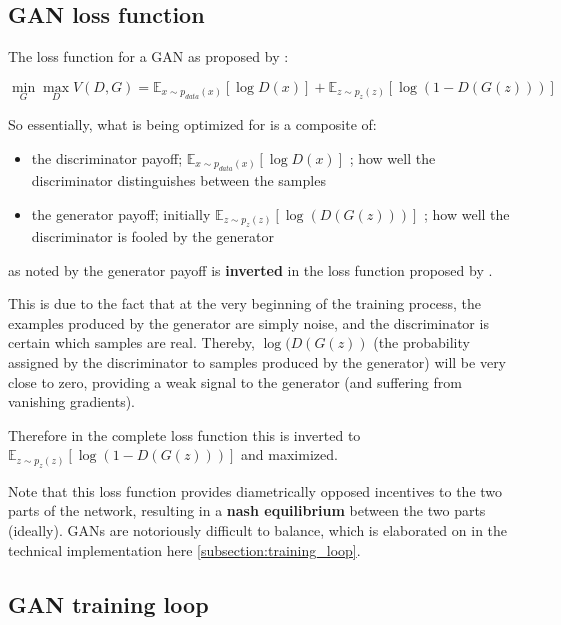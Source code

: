 \pagebreak

\subsection{GAN loss function}

The loss function for a \ac{GAN} as proposed by \cite{goodfellow2014generative}:

$$\min_G \max_D V(D, G)=
\mathbb{E}_{x\sim p_{data}(x)}[\log D(x)]
+ \mathbb{E}_{z\sim p_z(z)}[\log(1 - D(G(z)))]$$

So essentially, what is being optimized for is a composite of:

\begin{itemize}
	\item the discriminator payoff; $\mathbb{E}_{x\sim p_{data}(x)}[\log D(x)]$ ; how well the discriminator distinguishes between the samples
	\item the generator payoff; initially $\mathbb{E}_{z\sim p_z(z)}[\log(D(G(z)))]$ ; how well the discriminator is fooled by the generator
\end{itemize}

as noted by \cite{raschka2017python} the generator payoff is \textbf{inverted} in the loss function proposed by \cite{goodfellow2014generative}. 

This is due to the fact that at the very beginning of the training process, the examples produced by the generator are simply noise, and the discriminator is certain which samples are real. Thereby, $\log(D(G(z))$ (the probability assigned by the discriminator to samples produced by the generator) will be very close to zero, providing a weak signal to the generator (and suffering from vanishing gradients). 

Therefore in the complete loss function this is inverted to $\mathbb{E}_{z\sim p_z(z)}[\log(1 - D(G(z)))]$ and maximized.

Note that this loss function provides diametrically opposed incentives to the two parts of the network, resulting in a \textbf{nash equilibrium} between the two parts (ideally).
\acp{GAN} are notoriously difficult to balance, which is elaborated on in the technical implementation here \ref{subsection:training_loop}.

\pagebreak

\subsection{GAN training loop}

